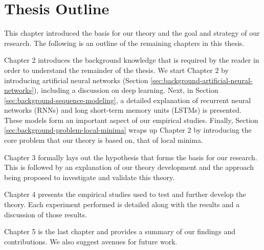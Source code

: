 \section{Thesis Outline} \label{sec:introduction-thesis-outline}

This chapter introduced the basis for our theory and the goal and strategy of our research. The following is an outline of the remaining chapters in this thesis.

Chapter 2 introduces the background knowledge that is required by the reader in order to understand the remainder of the thesis. We start Chapter 2 by introducing artificial neural networks (Section \ref{sec:background-artificial-neural-networks}), including a discussion on deep learning. Next, in Section \ref{sec:background-sequence-modeling}, a detailed explanation of recurrent neural networks (RNNs) and long short-term memory units (LSTMs) is presented. These models form an important aspect of our empirical studies. Finally, Section \ref{sec:background-problem-local-minima} wraps up Chapter 2 by introducing the core problem that our theory is based on, that of local minima.

Chapter 3 formally lays out the hypothesis that forms the basis for our research. This is followed by an explanation of our theory development and the approach being proposed to investigate and validate this theory. 

Chapter 4 presents the empirical studies used to test and further develop the theory. Each experiment performed is detailed along with the results and a discussion of those results.

Chapter 5 is the last chapter and provides a summary of our findings and contributions. We also suggest avenues for future work.